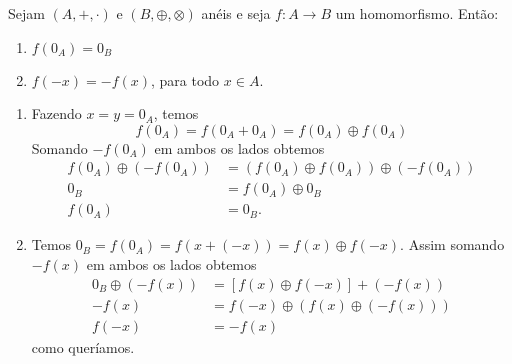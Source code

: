 \begin{proposicao}
    Sejam $(A, +, \cdot)$ e $(B, \oplus, \otimes)$ anéis e seja $f : A \to B$ um homomorfismo. Então:
    \begin{enumerate}[label={\roman*})]
        \item $f(0_{A}) = 0_{B}$
        \item $f(-x) = -f(x)$, para todo $x \in A$.
    \end{enumerate}
\end{proposicao}
\begin{prova}
    \begin{enumerate}[label={\roman*})]
        \item Fazendo $x = y = 0_{A}$, temos
        \[
            f(0_A) = f(0_A + 0_A) = f(0_A) \oplus f(0_A)
        \]
        Somando $-f(0_A)$ em ambos os lados obtemos
        \begin{align*}
            f(0_A) \oplus (-f(0_A)) &= (f(0_A)\oplus f(0_A)) \oplus (-f(0_A))\\
            0_B &= f(0_A) \oplus 0_B\\
            f(0_A) &= 0_B.
        \end{align*}

        \item Temos $0_B = f(0_A) = f(x + (-x)) = f(x)\oplus f(-x)$. Assim somando $-f(x)$ em ambos os lados obtemos
        \begin{align*}
            0_B\oplus(-f(x)) &= [f(x)\oplus f(-x)] + (-f(x))\\
            -f(x) &= f(-x) \oplus (f(x) \oplus (-f(x)))\\
            f(-x) &= -f(x)
        \end{align*}
        como queríamos.
    \end{enumerate}
\end{prova}

